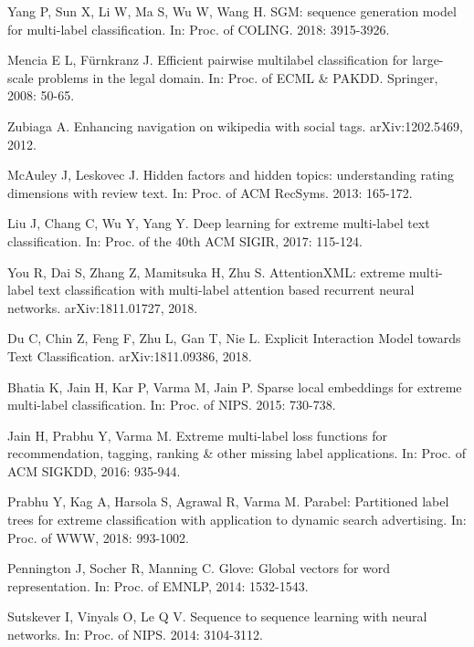\documentclass[runningheads]{llncs}
\begin{document}
\begin{thebibliography}{8}


Yang P, Sun X, Li W, Ma S, Wu W, Wang H. SGM: sequence generation model for multi-label classification. In: Proc. of COLING. 2018: 3915-3926.

Mencia E L, Fürnkranz J. Efficient pairwise multilabel classification for large-scale problems in the legal domain. In: Proc. of ECML \& PAKDD. Springer, 2008: 50-65.

Zubiaga A. Enhancing navigation on wikipedia with social tags. arXiv:1202.5469, 2012.

McAuley J, Leskovec J. Hidden factors and hidden topics: understanding rating dimensions with review text. In: Proc. of ACM RecSyms. 2013: 165-172.

Liu J, Chang C, Wu Y, Yang Y. Deep learning for extreme multi-label text classification. In: Proc. of the 40th ACM SIGIR, 2017: 115-124.

You R, Dai S, Zhang Z, Mamitsuka H, Zhu S. AttentionXML: extreme multi-label text classification with multi-label attention based recurrent neural networks. arXiv:1811.01727, 2018.

Du C, Chin Z, Feng F, Zhu L, Gan T, Nie L. Explicit Interaction Model towards Text Classification. arXiv:1811.09386, 2018.

Bhatia K, Jain H, Kar P, Varma M, Jain P. Sparse local embeddings for extreme multi-label classification. In: Proc. of NIPS. 2015: 730-738.

Jain H, Prabhu Y, Varma M. Extreme multi-label loss functions for recommendation, tagging, ranking \& other missing label applications. In: Proc. of ACM SIGKDD, 2016: 935-944.

Prabhu Y, Kag A, Harsola S, Agrawal R, Varma M. Parabel: Partitioned label trees for extreme classification with application to dynamic search advertising. In: Proc. of WWW, 2018: 993-1002.

Pennington J, Socher R, Manning C. Glove: Global vectors for word representation. In: Proc. of EMNLP, 2014: 1532-1543.

Sutskever I, Vinyals O, Le Q V. Sequence to sequence learning with neural networks. In: Proc. of NIPS. 2014: 3104-3112.


\end{thebibliography}
\end{document}
